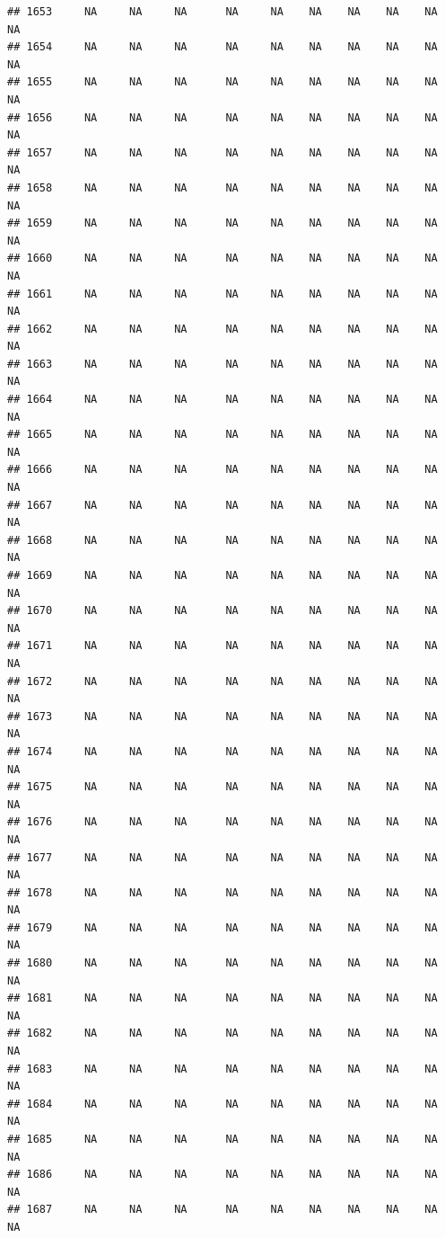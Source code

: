 \documentclass{article}\usepackage{graphicx, color}
\makeatletter
\newenvironment{kframe}{%
 \def\at@end@of@kframe{}%
 \ifinner\ifhmode%
  \def\at@end@of@kframe{\end{minipage}}%
  \begin{minipage}{\columnwidth}%
 \fi\fi%
 \def\FrameCommand##1{\hskip\@totalleftmargin \hskip-\fboxsep
 \colorbox{shadecolor}{##1}\hskip-\fboxsep
     \hskip-\linewidth \hskip-\@totalleftmargin \hskip\columnwidth}%
 \MakeFramed {\advance\hsize-\width
   \@totalleftmargin\z@ \linewidth\hsize
   \@setminipage}}%
 {\par\unskip\endMakeFramed%
 \at@end@of@kframe}
\newenvironment{knitrout}{}{} %
\makeatother
\begin{document}
\begin{knitrout}
\begin{kframe}
\begin{verbatim}
## 1653     NA     NA     NA      NA     NA    NA    NA    NA    NA     NA
## 1654     NA     NA     NA      NA     NA    NA    NA    NA    NA     NA
## 1655     NA     NA     NA      NA     NA    NA    NA    NA    NA     NA
## 1656     NA     NA     NA      NA     NA    NA    NA    NA    NA     NA
## 1657     NA     NA     NA      NA     NA    NA    NA    NA    NA     NA
## 1658     NA     NA     NA      NA     NA    NA    NA    NA    NA     NA
## 1659     NA     NA     NA      NA     NA    NA    NA    NA    NA     NA
## 1660     NA     NA     NA      NA     NA    NA    NA    NA    NA     NA
## 1661     NA     NA     NA      NA     NA    NA    NA    NA    NA     NA
## 1662     NA     NA     NA      NA     NA    NA    NA    NA    NA     NA
## 1663     NA     NA     NA      NA     NA    NA    NA    NA    NA     NA
## 1664     NA     NA     NA      NA     NA    NA    NA    NA    NA     NA
## 1665     NA     NA     NA      NA     NA    NA    NA    NA    NA     NA
## 1666     NA     NA     NA      NA     NA    NA    NA    NA    NA     NA
## 1667     NA     NA     NA      NA     NA    NA    NA    NA    NA     NA
## 1668     NA     NA     NA      NA     NA    NA    NA    NA    NA     NA
## 1669     NA     NA     NA      NA     NA    NA    NA    NA    NA     NA
## 1670     NA     NA     NA      NA     NA    NA    NA    NA    NA     NA
## 1671     NA     NA     NA      NA     NA    NA    NA    NA    NA     NA
## 1672     NA     NA     NA      NA     NA    NA    NA    NA    NA     NA
## 1673     NA     NA     NA      NA     NA    NA    NA    NA    NA     NA
## 1674     NA     NA     NA      NA     NA    NA    NA    NA    NA     NA
## 1675     NA     NA     NA      NA     NA    NA    NA    NA    NA     NA
## 1676     NA     NA     NA      NA     NA    NA    NA    NA    NA     NA
## 1677     NA     NA     NA      NA     NA    NA    NA    NA    NA     NA
## 1678     NA     NA     NA      NA     NA    NA    NA    NA    NA     NA
## 1679     NA     NA     NA      NA     NA    NA    NA    NA    NA     NA
## 1680     NA     NA     NA      NA     NA    NA    NA    NA    NA     NA
## 1681     NA     NA     NA      NA     NA    NA    NA    NA    NA     NA
## 1682     NA     NA     NA      NA     NA    NA    NA    NA    NA     NA
## 1683     NA     NA     NA      NA     NA    NA    NA    NA    NA     NA
## 1684     NA     NA     NA      NA     NA    NA    NA    NA    NA     NA
## 1685     NA     NA     NA      NA     NA    NA    NA    NA    NA     NA
## 1686     NA     NA     NA      NA     NA    NA    NA    NA    NA     NA
## 1687     NA     NA     NA      NA     NA    NA    NA    NA    NA     NA

\end{verbatim}
\end{kframe}
\end{knitrout}
\end{document}
